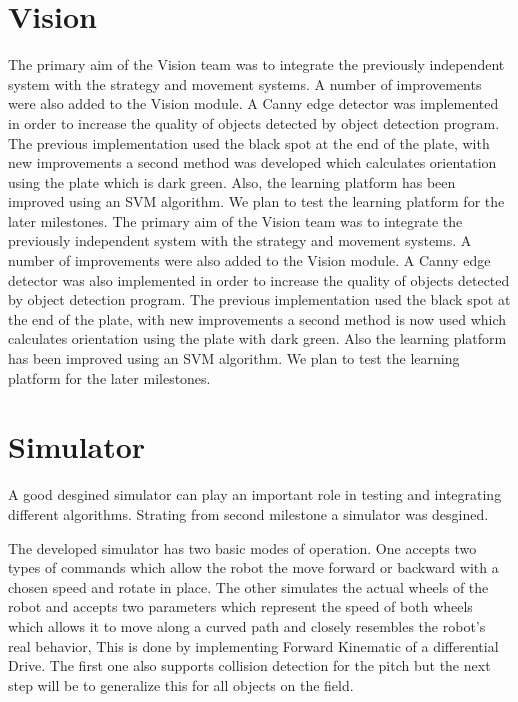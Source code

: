 \documentclass[conference,12pt]{IEEEtran}
\begin{document}
\section{Vision}
\vspace{-2 mm}
The primary aim of the Vision team was to integrate the previously independent system with the strategy and movement systems. A number of improvements were also added to the Vision module. A Canny edge detector was implemented in order to increase the quality of objects detected by object detection program. The previous implementation used the black spot at the end of the plate, with new improvements a second method was developed which calculates orientation using the plate which is dark green. Also, the learning platform has been improved using an SVM algorithm. We plan to test the learning platform for the later milestones.
The primary aim of the Vision team was to integrate the previously independent system with the strategy and movement systems. A number of improvements were also added to the Vision module. A Canny edge detector was also implemented in order to increase the quality of objects detected by object detection program. The previous implementation used the black spot at the end of the plate, with new improvements a second method is now used which calculates orientation using the plate with dark green. Also the learning platform has been improved using an SVM algorithm. We plan to test the learning platform for the later milestones.
\vspace{-2 mm}
\section{Simulator}
\vspace{-2 mm}
A good desgined simulator can play an important role in testing and integrating different algorithms. Strating from second milestone a simulator was desgined.
 
The developed simulator has two basic modes of operation. One accepts two types of commands which allow the robot the move forward or backward with a chosen speed and rotate in place. The other simulates the actual wheels of the robot and accepts two parameters which represent the speed of both wheels which allows it to move along a curved path and closely resembles the robot's real behavior, This is done by implementing Forward Kinematic of a differential Drive. The first one also supports collision detection for the pitch but the next step will be to generalize this for all objects on the field.
\end{document}
